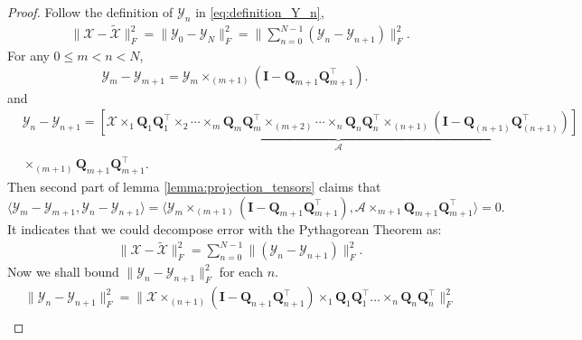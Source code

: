 \begin{lem}
\begin{proof}
Follow the definition of $\mathscr{Y}_n$ in \ref{eq:definition_Y_n}, 
\begin{equation}\label{eq: y_diff}
\begin{aligned}
& \|\mathscr{X}-\tilde{\mathscr{X}}\|_F^2 = \|\mathscr{Y}_0 - \mathscr{Y}_N\|_F^2= \|\sum_{n=0}^{N-1} (\mathscr{Y}_n - \mathscr{Y}_{n+1})\|_F^2.
\end{aligned}
\end{equation}
For any $0\le m< n < N$, 
\begin{equation}
\mathscr{Y}_m-\mathscr{Y}_{m+1} = \mathscr{Y}_{m} \times_{(m+1)} (\mathbf{I} - \mathbf{Q}_{m+1}\mathbf{Q}^\top_{m+1}). 
\end{equation}
and 
\begin{equation}
\begin{aligned}
&\mathscr{Y}_n - \mathscr{Y}_{n+1}  = \underbrace{\left[\mathscr{X}\times_1 \mathbf{Q}_{1}\mathbf{Q}^\top_{1} \times_2 \cdots \times_{m} \mathbf{Q}_{m}\mathbf{Q}^\top_{m}\times_{(m+2)} \cdots  \times_{n} \mathbf{Q}_{n}\mathbf{Q}^\top_{n}\times_{(n+1)}(\mathbf{I}-\mathbf{Q}_{(n+1)}\mathbf{Q}^\top_{(n+1)})\right]}_{\mathscr{A}}\\
&\times_{(m+1)} \mathbf{Q}_{m+1}\mathbf{Q}^\top_{m+1}.
\end{aligned}
\end{equation}
Then second part of lemma \ref{lemma:projection_tensors} claims that 
\begin{equation}\label{eq:inner_prod1}
\langle\mathscr{Y}_m-\mathscr{Y}_{m+1},  \mathscr{Y}_n - \mathscr{Y}_{n+1}\rangle = \langle\mathscr{Y}_{m} \times_{(m+1)} (\mathbf{I} - \mathbf{Q}_{m+1}\mathbf{Q}^\top_{m+1}), \mathscr{A} \times_{m+1} \mathbf{Q}_{m+1}\mathbf{Q}^\top_{m+1} \rangle = 0.
\end{equation}
It indicates that we could decompose error with the Pythagorean Theorem as:  
\begin{equation}
\label{eq:comression_decomposition}
\begin{aligned}
& \|\mathscr{X}-\tilde{\mathscr{X}}\|_F^2 =  \sum_{n=0}^{N-1} \| (\mathscr{Y}_n - \mathscr{Y}_{n+1})\|_F^2.
\end{aligned}
\end{equation}
Now we shall bound $\|\mathscr{Y}_n - \mathscr{Y}_{n+1}\|_F^2$ for each $n$.   
\begin{equation} \label{eq: y_diff_bound}
\begin{aligned}
&\|\mathscr{Y}_n - \mathscr{Y}_{n+1}\|_F^2 = \|\mathscr{X}\times_{(n+1)} (\mathbf{I} - \mathbf{Q}_{n+1}\mathbf{Q}_{n+1}^\top)\times_{1} \mathbf{Q}_{1}\mathbf{Q}_{1}^\top\dots \times_n \mathbf{Q}_{n}\mathbf{Q}_{n}^\top\|_F^2 \\

\end{aligned}
\end{equation}
\end{proof}
\end{lem}
